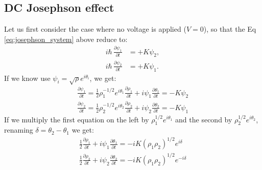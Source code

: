 \documentclass[a4paper,11pt]{article}
\newcommand{\ddp}[2]{\frac{\partial #1}{\partial #2 }}
\begin{document}
\subsection{DC Josephson effect}
Let us first consider the case where no voltage is applied ($V=0$), so that the Eq \ref{eq:josephson_system} above reduce to:
\begin{equation}
\begin{aligned}
i\hbar\,\ddp{\psi_1}{t}&=+K\psi_2,\\
i\hbar\,\ddp{\psi_2}{t}&=+K\psi_1.
\end{aligned}
\end{equation}
If we know use $\psi_i = \sqrt{\rho} e^{i \theta_i}$, we get:
\begin{equation}
\begin{aligned}
\ddp{\psi_1}{t} = \frac{1}{2}\rho_1^{-1/2} e^{i\theta_1} \ddp{\rho_1}{t} + i\psi_1 \ddp{\theta_1}{t} = -K \psi_2\\ 
\ddp{\psi_2}{t} = \frac{1}{2}\rho_2^{-1/2} e^{i\theta_2} \ddp{\rho_2}{t} + i\psi_2 \ddp{\theta_2}{t} = -K \psi_1
\end{aligned}
\end{equation}
If we multiply the first equation on the left by $\rho_1^{1/2} e^{i\theta_1}$ and the second by $\rho_2^{1/2} e^{i\theta_2}$, renaming $\delta = \theta_2 - \theta_1$ we get:
\begin{equation}
\begin{aligned}
\frac{1}{2} \ddp{\rho_1}{t} + i\psi_1 \ddp{\theta_1}{t} = -i K (\rho_1 \rho_2)^{1/2} e^{i\delta}\\ 
\frac{1}{2} \ddp{\rho_2}{t} + i\psi_2 \ddp{\theta_2}{t} = -i K (\rho_1 \rho_2)^{1/2} e^{-i\delta}
\end{aligned}
\end{equation}
\end{document}
